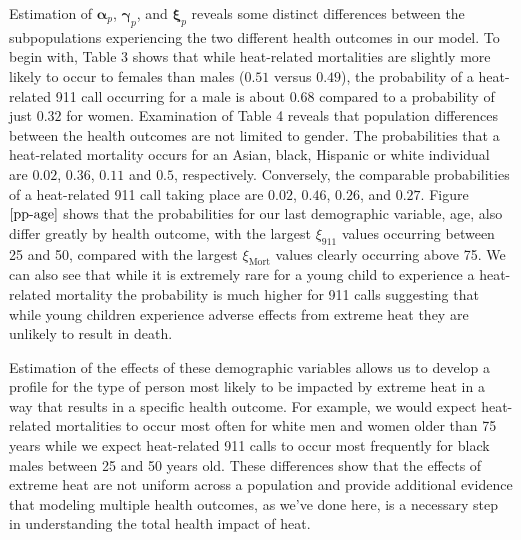 \documentclass[final]{statsoc}
\begin{document}
Estimation of $\boldsymbol\alpha_p$, $\boldsymbol\gamma_p$, and $\boldsymbol\xi_p$ reveals some distinct differences between the subpopulations experiencing the two different health outcomes in our model. To begin with, Table 3
shows that while heat-related mortalities are slightly more likely to occur to females than males ($0.51$ versus $0.49$), the probability of a heat-related 911 call occurring for a male is about $0.68$ compared to a probability of just $0.32$ for women. Examination of Table 4 %
reveals that population differences between the health outcomes are not limited to gender. The probabilities that a heat-related mortality occurs for an Asian, black, Hispanic or white individual are $0.02$, $0.36$, $0.11$ and $0.5$, respectively. Conversely, the comparable probabilities of a heat-related 911 call taking place are $0.02$, $0.46$, $0.26$, and $0.27$.  Figure $\ref{pp-age}$ shows that the probabilities for our last demographic variable, age, also differ greatly by health outcome, with the largest $\xi_{911}$ values occurring between 25 and 50, compared with the largest $\xi_{\text{Mort}}$ values clearly occurring above 75. We can also see that while it is extremely rare for a young child to experience a heat-related mortality the probability is much higher for 911 calls suggesting that while young children experience adverse effects from extreme heat they are unlikely to result in death. 

Estimation of the effects of these demographic variables allows us to develop a profile for the type of person most likely to be impacted by extreme heat in a way that results in a specific health outcome. For example, we would expect heat-related mortalities to occur most often for white men and women older than 75 years while we expect heat-related 911 calls to occur most frequently for black males between 25 and 50 years old. These differences show that the effects of extreme heat are not uniform across a population and provide additional evidence that modeling multiple health outcomes, as we've done here, is a necessary step in understanding the total health impact of heat. 
\end{document}
